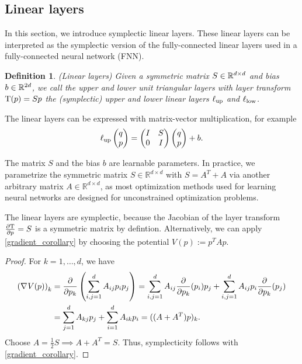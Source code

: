 \documentclass[twoside,a4paper]{article}
\newtheorem{definition}{Definition}
\begin{document}
\subsection{Linear layers}
In this section, we introduce symplectic linear layers. These linear layers can be interpreted 
as the symplectic version of the fully-connected linear layers used in a fully-connected
neural network (FNN).

\begin{definition}\label{def_linear_layer}
	(Linear layers)
	Given a symmetric matrix $S \in \mathbb{R}^{d \times d}$ and bias $b \in \mathbb{R}^{2d}$,
	we call the upper and lower unit triangular layers
	with layer transform $\mathrm{T}(p) = Sp$ the (symplectic) upper and lower 
	linear layers $\ell_{\text{up}}$ and $\ell_{\text{low}}$.
\end{definition}

The linear layers can be expressed with matrix-vector multiplication, for example
\begin{equation*}
	\ell_{\text{up}} \begin{pmatrix} q \\ p \end{pmatrix} = \begin{pmatrix}
		I & S \\
		0 & I
	\end{pmatrix} \begin{pmatrix} q \\ p \end{pmatrix} + b
	.
\end{equation*}

The matrix $S$ and the bias $b$ are learnable parameters.
In practice, we parametrize the symmetric matrix $S\in \mathbb{R}^{d \times d}$
with $S = A^T + A$ via another arbitrary matrix $A\in \mathbb{R}^{d \times d}$, as
most optimization methods used for learning neural networks are designed for
unconstrained optimization problems.

The linear layers are symplectic, because the Jacobian of the layer transform $\frac{\partial \mathrm{T}}{\partial p} = S$
is a symmetric matrix by defintion. Alternatively, we can apply \cref{gradient_corollary} by
choosing the potential $V(p) := p^TAp$.

\begin{proof}
	For $k=1, \dots, d$, we have
	\begin{align*}
		\left( \nabla_{}{V}(p) \right)_k &= \frac{\partial }{\partial p_k} \left( \sum_{i,j=1}^d A_{ij} p_i p_j \right)
		= \sum_{i,j=1}^d A_{ij} \frac{\partial }{\partial p_k}(p_i) p_j + \sum_{i,j=1}^d A_{ij} p_i \frac{\partial }{\partial p_k}(p_j) \\
		&= \sum_{j=1}^d A_{kj} p_j + \sum_{i=1}^d A_{ik} p_i = ((A+A^T)p)_k
		.
	\end{align*}
	Choose $A=\frac{1}{2}S \implies A+A^T=S$.
	Thus, symplecticity follows with \cref{gradient_corollary}.
\end{proof}
\end{document}
